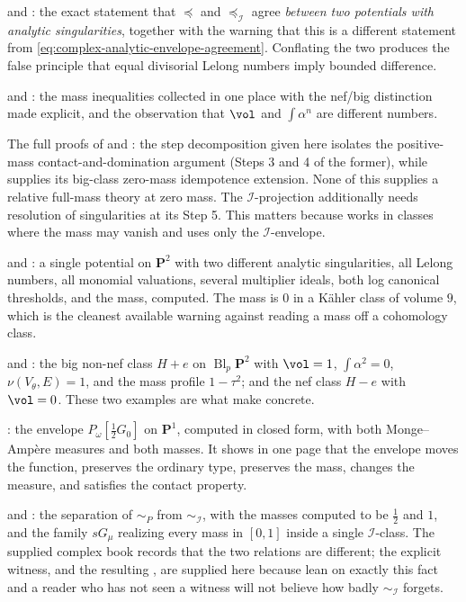 and : the exact
statement that \(\preceq\) and \(\preceq_{\mathcal I}\) agree
\emph{between two potentials with analytic singularities}, together with
the warning that this is a different statement from
\eqref{eq:complex-analytic-envelope-agreement}.  Conflating the two
produces the false principle that equal divisorial Lelong numbers imply
bounded difference.

 and
: the mass inequalities collected
in one place with the nef/big distinction made explicit, and the
observation that \(\vol\) and \(\int\alpha^n\) are different numbers.

The full proofs of  and
: the step decomposition given here
isolates the positive-mass contact-and-domination argument (Steps 3 and 4
of the former), while \cite[Theorem~1.2]{PSWZ26} supplies its big-class
zero-mass idempotence extension.  None of this supplies a relative
full-mass theory at zero mass.  The \(\mathcal I\)-projection additionally
needs resolution of singularities at its Step 5.  This matters because
 works in classes where the mass may
vanish and uses only the \(\mathcal I\)-envelope.

 and : a single potential
on \(\mathbf P^2\) with two different analytic singularities, all Lelong
numbers, all monomial valuations, several multiplier ideals, both log
canonical thresholds, and the mass, computed.  The mass is \(0\) in a
K\"ahler class of volume \(9\), which is the cleanest available warning
against reading a mass off a cohomology class.

 and : the
big non-nef class \(H+e\) on \(\operatorname{Bl}_p\mathbf P^2\) with
\(\vol=1\), \(\int\alpha^2=0\), \(\nu(V_\theta,E)=1\), and the mass
profile \(1-\tau^2\); and the nef class \(H-e\) with \(\vol=0\).  These
two examples are what make  concrete.

: the envelope \(P_\omega[\frac12G_0]\) on
\(\mathbf P^1\), computed in closed form, with both Monge--Amp\`ere
measures and both masses.  It shows in one page that the envelope moves
the function, preserves the ordinary type, preserves the mass, changes
the measure, and satisfies the contact property.

 and : the separation of
\(\sim_P\) from \(\sim_{\mathcal I}\), with the masses computed to be
\(\frac12\) and \(1\), and the family \(sG_\mu\) realizing every mass in
\([0,1]\) inside a single \(\mathcal I\)-class.  The supplied complex
book records that the two relations are different; the explicit witness,
and the resulting , are supplied here
because  lean on
exactly this fact and a reader who has not seen a witness will not
believe how badly \(\sim_{\mathcal I}\) forgets.

